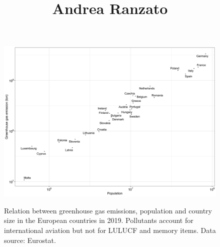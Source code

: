 \documentclass[a4paper]{article}
\begin{document}
\title{Andrea Ranzato}
\date{}
\maketitle

\vspace*{-15mm}
\thispagestyle{empty}

\begin{figure}[!htb]
\centering
\subfigure[]
{	\includegraphics[width=13cm]{plots/population.png}
}\hfill
{}
\caption{Relation between greenhouse gas emissions, population and country size in the European countries in 2019. Pollutants account for international aviation but not for LULUCF and memory items. Data source: Eurostat.}
\end{figure}
\end{document}
